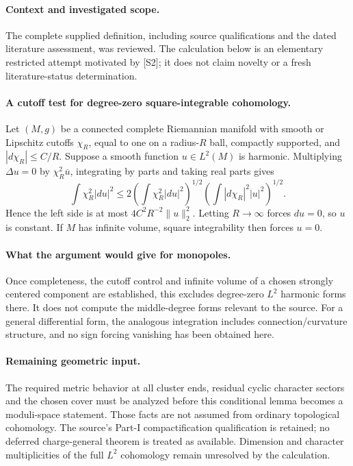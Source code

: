 \documentclass[11pt]{article}
\begin{document}
\paragraph{Context and investigated scope.} The complete supplied definition, including source qualifications and the dated literature assessment, was reviewed. The calculation below is an elementary restricted attempt motivated by [S2]; it does not claim novelty or a fresh literature-status determination.

\paragraph{A cutoff test for degree-zero square-integrable cohomology.} Let $(M,g)$ be a connected complete Riemannian manifold with smooth or Lipschitz cutoffs $\chi_R$, equal to one on a radius-$R$ ball, compactly supported, and $|d\chi_R|\leq C/R$. Suppose a smooth function $u\in L^2(M)$ is harmonic. Multiplying $\Delta u=0$ by $\chi_R^2\overline u$, integrating by parts and taking real parts gives
\[
 \int\chi_R^2|du|^2
 \leq2\left(\int\chi_R^2|du|^2\right)^{1/2}
       \left(\int|d\chi_R|^2|u|^2\right)^{1/2}.
\]
Hence the left side is at most $4C^2R^{-2}\|u\|_2^2$. Letting $R\to\infty$ forces $du=0$, so $u$ is constant. If $M$ has infinite volume, square integrability then forces $u=0$.

\paragraph{What the argument would give for monopoles.} Once completeness, the cutoff control and infinite volume of a chosen strongly centered component are established, this excludes degree-zero $L^2$ harmonic forms there. It does not compute the middle-degree forms relevant to the source. For a general differential form, the analogous integration includes connection/curvature structure, and no sign forcing vanishing has been obtained here.

\paragraph{Remaining geometric input.} The required metric behavior at all cluster ends, residual cyclic character sectors and the chosen cover must be analyzed before this conditional lemma becomes a moduli-space statement. Those facts are not assumed from ordinary topological cohomology. The source's Part-I compactification qualification is retained; no deferred charge-general theorem is treated as available. Dimension and character multiplicities of the full $L^2$ cohomology remain unresolved by the calculation.
\end{document}
